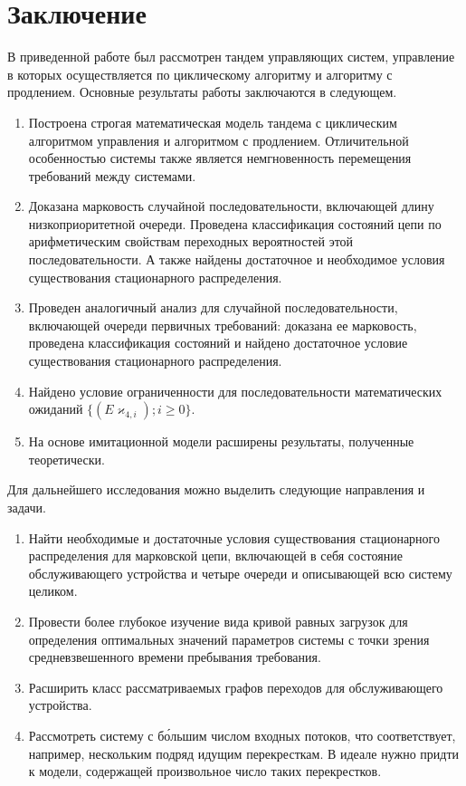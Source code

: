 \chapter*{Заключение}						%
В приведенной работе был рассмотрен тандем управляющих систем, управление в которых осуществляется по циклическому алгоритму и алгоритму с продлением. Основные результаты работы заключаются в следующем.

    \begin{enumerate}
        \item Построена строгая математическая модель тандема с циклическим алгоритмом управления и алгоритмом с продлением. Отличительной особенностью системы также является немгновенность перемещения требований между системами. 
        \item Доказана марковость случайной последовательности, включающей длину низкоприоритетной очереди. Проведена классификация состояний цепи по арифметическим свойствам переходных вероятностей этой последовательности. А также найдены достаточное и необходимое условия существования стационарного распределения.
        \item Проведен аналогичный анализ для случайной последовательности, включающей очереди первичных требований: доказана ее марковость, проведена классификация состояний и найдено достаточное условие существования стационарного распределения.
        \item Найдено условие ограниченности для последовательности математических ожиданий $    \{( E\varkappa_{4,i}); i \geqslant 0\}$.
        \item На основе имитационной модели расширены результаты, полученные теоретически.
    \end{enumerate}
Для дальнейшего исследования можно выделить следующие направления и задачи.
\begin{enumerate}
    \item Найти необходимые и достаточные условия существования стационарного распределения для марковской цепи, включающей в себя состояние обслуживающего устройства и четыре очереди и описывающей всю систему целиком.
    \item Провести более глубокое изучение вида кривой равных загрузок для определения оптимальных значений параметров системы с точки зрения средневзвешенного времени пребывания требования.
    \item Расширить класс рассматриваемых графов переходов для обслуживающего устройства.
    \item Рассмотреть систему с б\'{о}льшим числом входных потоков, что соответствует, например, нескольким подряд идущим перекресткам. В идеале нужно придти к модели, содержащей произвольное число таких перекрестков.
\end{enumerate}


